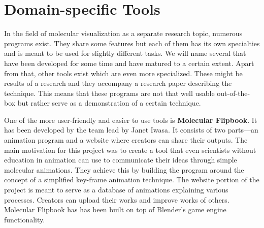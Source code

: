 \documentclass[
  digital, %
  table,   %
  nolof,     %
  nolot,     %
  oneside,
]{fithesis3}
\begin{document}


\section{Domain-specific Tools}
In the field of molecular visualization as a separate research topic, numerous programs exist. They share some features but each of them has its own specialties and is meant to be used for slightly different tasks. We will name several that have been developed for some time and have matured to a certain extent. Apart from that, other tools exist which are even more specialized. These might be results of a research and they accompany a research paper describing the technique. This means that these programs are not that well usable out-of-the-box but rather serve as a demonstration of a certain technique.

One of the more user-friendly and easier to use tools is \textbf{Molecular Flipbook}. It has been developed by the team lead by Janet Iwasa. It consists of two parts—an animation program and a website where creators can share their outputs. The main motivation for this project was to create a tool that even scientists without education in animation can use to communicate their ideas through simple molecular animations. They achieve this by building the program around the concept of a simplified key-frame animation technique. The website portion of the project is meant to serve as a database of animations explaining various processes. Creators can upload their works and improve works of others. Molecular Flipbook has has been built on top of Blender's game engine functionality.
\end{document}

